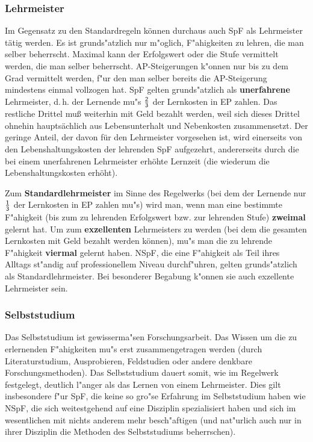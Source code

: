 \documentclass[10pt,a4paper,germanpar]{article}
\begin{document}
\subsubsection{Lehrmeister}

Im Gegensatz zu den Standardregeln können durchaus auch SpF als
Lehrmeister tätig werden. Es ist grunds"atzlich nur m"oglich,
F"ahigkeiten zu lehren, die man selber beherrscht. Maximal kann der
Erfolgswert oder die Stufe vermittelt werden, die man selber
beherrscht.  AP-Steigerungen k"onnen nur bis zu dem Grad vermittelt
werden, f"ur den man selber bereits die AP-Steigerung mindestens
einmal vollzogen hat. SpF gelten grunds"atzlich als
\textbf{unerfahrene} Lehrmeister, d.\,h. der Lernende mu"s $\frac{\sf
  2}{\sf 3}$ der Lernkosten in EP zahlen. Das restliche Drittel muß
weiterhin mit Geld bezahlt werden, weil sich dieses Drittel ohnehin
hauptsächlich aus Lebensunterhalt und Nebenkosten zusammensetzt. Der
geringe Anteil, der davon für den Lehrmeister vorgesehen ist, wird
einerseits von den Lebenshaltungskosten der lehrenden SpF aufgezehrt,
andererseits durch die bei einem unerfahrenen Lehrmeister erhöhte
Lernzeit (die wiederum die Lebenshaltungskosten erhöht).

Zum \textbf{Standardlehrmeister} im Sinne des Regelwerks (bei dem der
Lernende nur $\frac{\sf 1}{\sf 3}$ der Lernkosten in EP zahlen mu"s)
wird man, wenn man eine bestimmte F"ahigkeit (bis zum zu lehrenden
Erfolgswert bzw. zur lehrenden Stufe) \textbf{zweimal} gelernt hat. Um
zum \textbf{exzellenten} Lehrmeisters zu werden (bei dem die gesamten
Lernkosten mit Geld bezahlt werden können), mu"s man die zu lehrende
F"ahigkeit \textbf{viermal} gelernt haben. NSpF, die eine F"ahigkeit
als Teil ihres Alltags st"andig auf professionellem Niveau
durchf"uhren, gelten grunds"atzlich als Standardlehrmeister. Bei
besonderer Begabung k"onnen sie auch exzellente Lehrmeister sein.

\subsubsection{Selbststudium}
\label{selbststudium}

Das Selbststudium ist gewisserma"sen Forschungsarbeit. Das Wissen um
die zu erlernenden F"ahigkeiten mu"s erst zusammengetragen werden
(durch Literaturstudium, Ausprobieren, Feldstudien oder andere
denkbare Forschungsmethoden). Das Selbststudium dauert somit, wie im
Regelwerk festgelegt, deutlich l"anger als das Lernen von einem
Lehrmeister. Dies gilt insbesondere f"ur SpF, die keine so gro"se
Erfahrung im Selbststudium haben wie NSpF, die sich weitestgehend auf
eine Disziplin spezialisiert haben und sich im wesentlichen mit nichts
anderem mehr besch"aftigen (und nat"urlich auch nur in ihrer Disziplin
die Methoden des Selbststudiums beherrschen).
\end{document}
